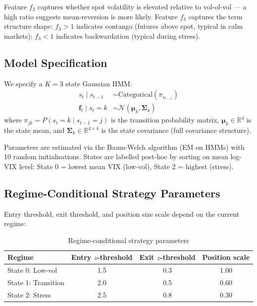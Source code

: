 \documentclass[12pt, letterpaper]{article}
\begin{document}
Feature $f_2$ captures whether spot volatility is elevated relative to
vol-of-vol — a high ratio suggests mean-reversion is more likely.
Feature $f_3$ captures the term structure shape: $f_3 > 1$ indicates
contango (futures above spot, typical in calm markets); $f_3 < 1$ indicates
backwardation (typical during stress).

\subsection{Model Specification}

We specify a $K=3$ state Gaussian HMM:
\begin{align}
  s_t \mid s_{t-1} &\sim \text{Categorical}(\pi_{s_{t-1}}) \label{eq:hmm_state}\\
  \mathbf{f}_t \mid s_t = k &\sim \mathcal{N}(\boldsymbol{\mu}_k, \boldsymbol{\Sigma}_k) \label{eq:hmm_obs}
\end{align}
where $\pi_{jk} = P(s_t = k \mid s_{t-1} = j)$ is the transition probability matrix,
$\boldsymbol{\mu}_k \in \mathbb{R}^4$ is the state mean, and
$\boldsymbol{\Sigma}_k \in \mathbb{R}^{4\times 4}$ is the state covariance (full covariance structure).

Parameters are estimated via the Baum-Welch algorithm (EM on HMMs) with 10 random
initialisations. States are labelled post-hoc by sorting on mean log-VIX level:
State 0 = lowest mean VIX (low-vol), State 2 = highest (stress).

\subsection{Regime-Conditional Strategy Parameters}

Entry threshold, exit threshold, and position size scale depend on the current
regime:

\begin{table}[h!]
\centering
\caption{Regime-conditional strategy parameters}
\begin{tabular}{lccc}
\toprule
\textbf{Regime} & \textbf{Entry $z$-threshold} & \textbf{Exit $z$-threshold} & \textbf{Position scale} \\
\midrule
State 0: Low-vol     & 1.5 & 0.3 & 1.00 \\
State 1: Transition  & 2.0 & 0.5 & 0.60 \\
State 2: Stress      & 2.5 & 0.8 & 0.30 \\
\bottomrule
\end{tabular}
\label{tab:regime_params}
\end{table}
\end{document}
